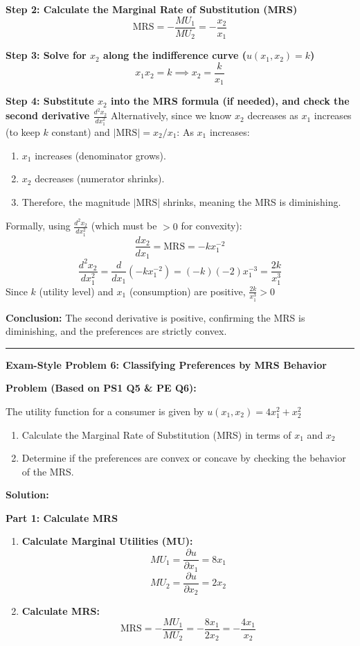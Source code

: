 \documentclass{article}
\begin{document}
\textbf{Step 2: Calculate the Marginal Rate of Substitution (MRS)} $$ \text{MRS} = -\frac{MU_1}{MU_2} = -\frac{x_2}{x_1} $$

\textbf{Step 3: Solve for $x_2$ along the indifference curve ($u(x_1, x_2) = k$)} $$ x_1 x_2 = k \implies x_2 = \frac{k}{x_1} $$

\textbf{Step 4: Substitute $x_2$ into the MRS formula (if needed), and check the second derivative $\frac{d^2x_2}{dx_1^2}$} Alternatively, since we know $x_2$ decreases as $x_1$ increases (to keep $k$ constant) and $|\text{MRS}| = x_2/x_1$: As $x_1$ increases:

\begin{enumerate}
    \item $x_1$ increases (denominator grows).
    \item $x_2$ decreases (numerator shrinks).
    \item Therefore, the magnitude $|\text{MRS}|$ shrinks, meaning the MRS is diminishing.
\end{enumerate}

Formally, using $\frac{d^2x_2}{dx_1^2}$ (which must be $> 0$ for convexity): $$ \frac{dx_2}{dx_1} = \text{MRS} = -k x_1^{-2} $$ $$ \frac{d^2x_2}{dx_1^2} = \frac{d}{dx_1}(-k x_1^{-2}) = (-k)(-2) x_1^{-3} = \frac{2k}{x_1^3} $$ Since $k$ (utility level) and $x_1$ (consumption) are positive, $\frac{2k}{x_1^3} > 0$

\textbf{Conclusion:} The second derivative is positive, confirming the MRS is diminishing, and the preferences are strictly convex.
\vspace{1em}

\hrule
\vspace{1em}
\textbf{Exam-Style Problem 6: Classifying Preferences by MRS Behavior}

\textbf{Problem (Based on PS1 Q5 \& PE Q6):}

The utility function for a consumer is given by $u(x_1, x_2) = 4x_1^2 + x_2^2$

\begin{enumerate}
    \item Calculate the Marginal Rate of Substitution (MRS) in terms of $x_1$ and $x_2$
    \item Determine if the preferences are convex or concave by checking the behavior of the MRS.
\end{enumerate}

\textbf{Solution:}

\textbf{Part 1: Calculate MRS}
\begin{enumerate}
    \item \textbf{Calculate Marginal Utilities (MU):} $$ MU_1 = \frac{\partial u}{\partial x_1} = 8x_1 $$ $$ MU_2 = \frac{\partial u}{\partial x_2} = 2x_2 $$
    \item \textbf{Calculate MRS:} $$ \text{MRS} = -\frac{MU_1}{MU_2} = -\frac{8x_1}{2x_2} = -\frac{4x_1}{x_2} $$
\end{enumerate}
\end{document}
